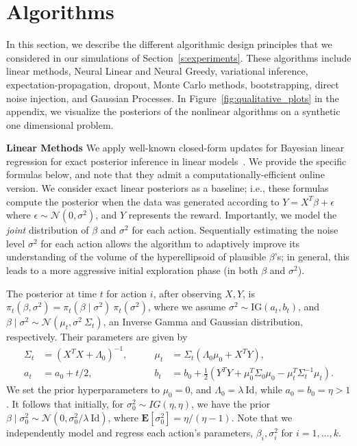 \documentclass{article} \usepackage{iclr2018_conference,times}
\begin{document}
%
 \section{Algorithms}\label{s:algorithms}

In this section, we describe the different algorithmic design principles that we considered in our simulations of Section~\ref{s:experiments}.
These algorithms include linear methods, Neural Linear and Neural Greedy, variational inference, expectation-propagation, dropout, Monte Carlo methods, bootstrapping, direct noise injection, and Gaussian Processes. 
In Figure~\ref{fig:qualitative_plots} in the appendix, we visualize the posteriors of the nonlinear algorithms on a synthetic one dimensional problem.

\textbf{Linear Methods} We apply well-known closed-form updates for Bayesian linear regression for exact posterior inference in linear models~\citep{bishop2006pattern}.
We provide the specific formulas below, and note that they admit a computationally-efficient online version.  We consider exact linear posteriors as a baseline; i.e., these formulas compute the posterior when the data was generated according to $Y = X^T \beta + \epsilon$ where $\epsilon \sim \mathcal{N}(0, \sigma^2)$, and $Y$ represents the reward.
Importantly, we model the \emph{joint} distribution of $\beta$ and $\sigma^2$ for each action.
Sequentially estimating the noise level $\sigma^2$ for each action allows the algorithm to adaptively improve its understanding of the volume of the hyperellipsoid of plausible $\beta$'s; in general, this leads to a more aggressive initial exploration phase (in both $\beta$ and $\sigma^2$).

The posterior at time $t$ for action $i$, after observing  $X, Y$, is $\pi_t(\beta, \sigma^2) = \pi_t(\beta \mid \sigma^2) \  \pi_t(\sigma^2)$, where we assume $\sigma^2 \sim \text{IG}(a_t, b_t)$, and $\beta \mid \sigma^2 \sim \mathcal{N}(\mu_t, \sigma^2 \ \Sigma_t)$, an Inverse Gamma and Gaussian distribution, respectively.
Their parameters are given by
\begin{align}\label{eq:bayesian_linear_regression}
\Sigma_t &= \left( X^TX + \Lambda_0 \right)^{-1}, \qquad& \mu_t &= \Sigma_t \left( \Lambda_0 \mu_0 + X^TY \right), \\
a_t &= a_0 +  t / 2, \qquad& b_t &= b_0 + \frac{1}{2} \left(Y^TY + \mu_0^T \Sigma_0 \mu_0 - \mu_t^T \Sigma_t^{-1} \mu_t \right). \label{eq:bayesian_linear_regression2}
\end{align}
We set the prior hyperparameters to $\mu_0 = 0$, and $\Lambda_0 = \lambda \ \mathrm{Id}$, while $a_0 = b_0 = \eta > 1$.
It follows that initially, for $\sigma_0^2 \sim IG(\eta, \eta)$, we have the prior $\beta \mid \sigma_0^2 \sim \mathcal{N}(0, {\sigma_0^2}/{\lambda} \ \mathrm{Id})$, where $\mathbf{E}[\sigma_0^2] = \eta / (\eta - 1)$.
Note that we independently model and regress each action's parameters, $\beta_i, \sigma_i^2$ for $i = 1, \dots, k$.
\end{document}
